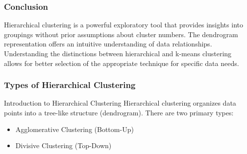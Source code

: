 \documentclass[aspectratio=169]{beamer}
\begin{document}
\begin{frame}[fragile]
    \frametitle{Conclusion}
    Hierarchical clustering is a powerful exploratory tool that provides insights into groupings without prior assumptions about cluster numbers. The dendrogram representation offers an intuitive understanding of data relationships. Understanding the distinctions between hierarchical and k-means clustering allows for better selection of the appropriate technique for specific data needs.
\end{frame}

\begin{frame}
    \frametitle{Types of Hierarchical Clustering}
    \begin{block}{Introduction to Hierarchical Clustering}
        Hierarchical clustering organizes data points into a tree-like structure (dendrogram). 
        There are two primary types:
        \begin{itemize}
            \item Agglomerative Clustering (Bottom-Up)
            \item Divisive Clustering (Top-Down)
        \end{itemize}
    \end{block}
\end{frame}
\end{document}

